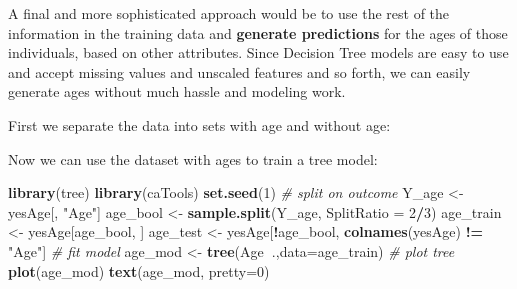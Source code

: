 \documentclass[]{article}
\newenvironment{Shaded}{\begin{snugshade}}{\end{snugshade}}
\newcommand{\KeywordTok}[1]{\textcolor[rgb]{0.13,0.29,0.53}{\textbf{#1}}}
\newcommand{\DataTypeTok}[1]{\textcolor[rgb]{0.13,0.29,0.53}{#1}}
\newcommand{\DecValTok}[1]{\textcolor[rgb]{0.00,0.00,0.81}{#1}}
\newcommand{\StringTok}[1]{\textcolor[rgb]{0.31,0.60,0.02}{#1}}
\newcommand{\CommentTok}[1]{\textcolor[rgb]{0.56,0.35,0.01}{\textit{#1}}}
\newcommand{\OperatorTok}[1]{\textcolor[rgb]{0.81,0.36,0.00}{\textbf{#1}}}
\newcommand{\NormalTok}[1]{#1}
\begin{document}
A final and more sophisticated approach would be to use the rest of the
information in the training data and \textbf{generate predictions} for
the ages of those individuals, based on other attributes. Since Decision
Tree models are easy to use and accept missing values and unscaled
features and so forth, we can easily generate ages without much hassle
and modeling work.

First we separate the data into sets with age and without age:

\begin{Shaded}
\end{Shaded}

Now we can use the dataset with ages to train a tree model:

\begin{Shaded}
\begin{Highlighting}[]
\KeywordTok{library}\NormalTok{(tree)}
\KeywordTok{library}\NormalTok{(caTools)}
\KeywordTok{set.seed}\NormalTok{(}\DecValTok{1}\NormalTok{) }
\CommentTok{# split on outcome}
\NormalTok{Y_age <-}\StringTok{ }\NormalTok{yesAge[, }\StringTok{"Age"}\NormalTok{]}
\NormalTok{age_bool <-}\StringTok{ }\KeywordTok{sample.split}\NormalTok{(Y_age, }\DataTypeTok{SplitRatio =} \DecValTok{2}\OperatorTok{/}\DecValTok{3}\NormalTok{) }
\NormalTok{age_train <-}\StringTok{ }\NormalTok{yesAge[age_bool, ]}
\NormalTok{age_test <-}\StringTok{ }\NormalTok{yesAge[}\OperatorTok{!}\NormalTok{age_bool, }\KeywordTok{colnames}\NormalTok{(yesAge) }\OperatorTok{!=}\StringTok{ "Age"}\NormalTok{]}
\CommentTok{# fit model}
\NormalTok{age_mod <-}\StringTok{ }\KeywordTok{tree}\NormalTok{(Age}\OperatorTok{~}\NormalTok{.,}\DataTypeTok{data=}\NormalTok{age_train)}
\CommentTok{# plot tree}
\KeywordTok{plot}\NormalTok{(age_mod)}
\KeywordTok{text}\NormalTok{(age_mod, }\DataTypeTok{pretty=}\DecValTok{0}\NormalTok{)}
\end{Highlighting}
\end{Shaded}
\end{document}
